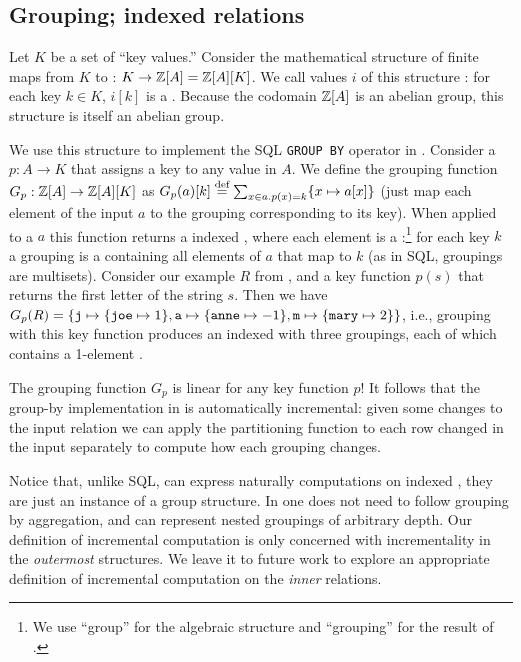\subsection{Grouping; indexed relations}\label{sec:grouping}

Let $K$ be a set of ``key values.''
Consider the mathematical structure of finite maps from $K$
to \zrs: $K \to \mathbb{Z}[A] = \mathbb{Z}[A][K]$.
We call values $i$ of this structure : for
each key $k \in K$, $i[k]$ is a \zr.  Because
the codomain $\mathbb{Z}[A]$ is an abelian group, this structure is itself
an abelian group.

We use this structure to implement the SQL \texttt{GROUP BY} operator in \dbsp.
Consider a 
$p: A \to K$ that assigns a key to any value in $A$.  We define the grouping function
$G_p: \mathbb{Z}[A] \to \mathbb{Z}[A][K]$ as $G_p(a)[k] \stackrel{\textrm{\scriptsize def}}{=} \sum_{x \in a.p(x)=k}\{
x \mapsto a[x] \}$
(just map each element of the input $a$ to the \zr grouping corresponding to its key).
When applied to a \zr $a$ this function returns a indexed \zr, where each element
is a :\footnote{We use
``group'' for the algebraic structure and ``grouping'' for the result of .} for each key $k$ a
grouping is a \zr containing all elements of $a$ that map to $k$
(as in SQL, groupings are multisets).
Consider our example \zr $R$ from ,
and a key function $p(s)$ that returns the first letter of the string
$s$. Then we have $G_p(R) = \{ \mbox{\texttt{j}} \mapsto \{ \mbox{\texttt{joe}}
\mapsto 1 \}, \mbox{\texttt{a}} \mapsto \{ \mbox{\texttt{anne}} \mapsto -1 \}, \mbox{\texttt{m}}
\mapsto \{ \mbox{\texttt{mary}} \mapsto 2 \} \}$,
i.e., grouping with this key function produces an indexed \zr with three groupings, each
of which contains a 1-element \zr.

The grouping function $G_p$ is linear for any key function $p$!
It follows that the group-by implementation in \dbsp is automatically
incremental: given some changes
to the input relation we can apply the partitioning function
to each row changed in the input separately to compute how each grouping changes.

Notice that, unlike SQL, \dbsp can express naturally computations
on indexed \zrs, they are just an instance of a group structure.
In \dbsp one does not need to follow
grouping by aggregation, and \dbsp can represent nested groupings
of arbitrary depth.  Our definition of incremental
computation is only concerned with incrementality in the
\emph{outermost} structures.  We leave it to future work to
explore an appropriate definition of incremental computation
on the \emph{inner} relations.


